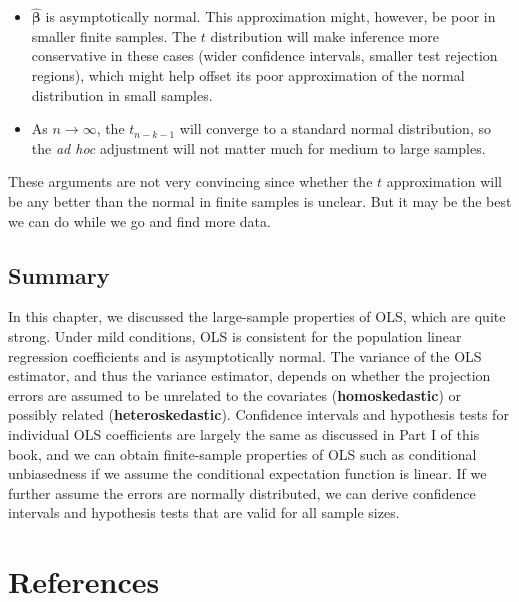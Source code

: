 \documentclass[
  13pt,
  letterpaper,
  DIV=11,
  numbers=noendperiod]{scrreprt}
\providecommand{\tightlist}{%
  \setlength{\itemsep}{0pt}\setlength{\parskip}{0pt}}
\newcommand{\mb}{\bm}
\newcommand{\bhat}{\widehat{\mb{\beta}}}
\theoremstyle{plain}
\theoremstyle{plain}
\theoremstyle{definition}
\theoremstyle{definition}
\theoremstyle{remark}
\begin{document}
\begin{itemize}
\tightlist
\item
  \(\bhat\) is asymptotically normal. This approximation might, however,
  be poor in smaller finite samples. The \(t\) distribution will make
  inference more conservative in these cases (wider confidence
  intervals, smaller test rejection regions), which might help offset
  its poor approximation of the normal distribution in small samples.
\item
  As \(n\to\infty\), the \(t_{n-k-1}\) will converge to a standard
  normal distribution, so the \emph{ad hoc} adjustment will not matter
  much for medium to large samples.
\end{itemize}

These arguments are not very convincing since whether the \(t\)
approximation will be any better than the normal in finite samples is
unclear. But it may be the best we can do while we go and find more
data.

\section{Summary}\label{summary-7}

In this chapter, we discussed the large-sample properties of OLS, which
are quite strong. Under mild conditions, OLS is consistent for the
population linear regression coefficients and is asymptotically normal.
The variance of the OLS estimator, and thus the variance estimator,
depends on whether the projection errors are assumed to be unrelated to
the covariates (\textbf{homoskedastic}) or possibly related
(\textbf{heteroskedastic}). Confidence intervals and hypothesis tests
for individual OLS coefficients are largely the same as discussed in
Part I of this book, and we can obtain finite-sample properties of OLS
such as conditional unbiasedness if we assume the conditional
expectation function is linear. If we further assume the errors are
normally distributed, we can derive confidence intervals and hypothesis
tests that are valid for all sample sizes.


\chapter*{References}\label{references}

\end{document}
